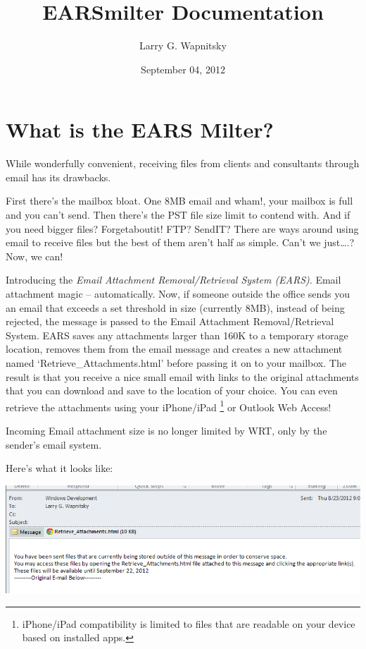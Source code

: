 \documentclass[letterpaper,10pt,english]{sphinxmanual}
\title{EARSmilter Documentation}
\date{September 04, 2012}
\author{Larry G. Wapnitsky}
\begin{document}
\maketitle
\tableofcontents
{}\label{index::doc}



\chapter{What is the EARS Milter?}
\label{about:wrt-e-mail-attachment-removal-retrieval-system-ears-milter}\label{about::doc}\label{about:what-is-the-ears-milter}
While wonderfully convenient, receiving files from clients and consultants through email has its drawbacks.

First there’s the mailbox bloat. One 8MB email and wham!, your mailbox is full and you can’t send.
Then there’s the PST file size limit to contend with.
And if you need bigger files? Forgetaboutit!
FTP? SendIT? There are ways around using email to receive files but the best of them aren’t half as simple.
Can’t we just….? Now, we can!

Introducing the \emph{Email Attachment Removal/Retrieval System (EARS)}. Email
attachment magic – automatically. Now, if someone outside the office sends you
an email that exceeds a set threshold in size (currently 8MB), instead of being
rejected, the message is passed to the Email Attachment Removal/Retrieval
System. EARS saves any attachments larger than 160K to a temporary storage
location, removes them from the email message and creates a new attachment
named ‘Retrieve\_Attachments.html’ before passing it on to your mailbox. The
result is that you receive a nice small email with links to the original
attachments that you can download and save to the location of your choice. You
can even retrieve the attachments using your iPhone/iPad \footnote{
iPhone/iPad compatibility is limited to files that are readable on your device based on installed apps.
} or Outlook Web
Access!

Incoming Email attachment size is no longer limited by WRT, only by the sender’s email system.

Here’s what it looks like:

\includegraphics{EARSmilter.png}
\end{document}
